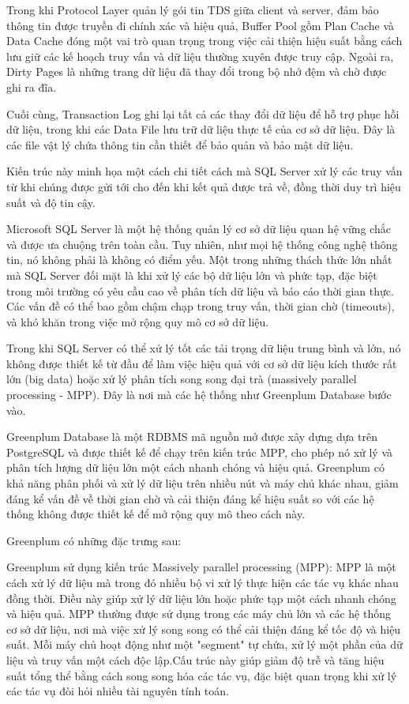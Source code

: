 \documentclass{article}[14pt]
\begin{document}
{{Trong khi Protocol Layer quản lý gói tin TDS giữa client và server, đảm bảo thông tin được truyền đi chính xác và hiệu quả, Buffer Pool gồm Plan Cache và Data Cache đóng một vai trò quan trọng trong việc cải thiện hiệu suất bằng cách lưu giữ các kế hoạch truy vấn và dữ liệu thường xuyên được truy cập. Ngoài ra, Dirty Pages là những trang dữ liệu đã thay đổi trong bộ nhớ đệm và chờ được ghi ra đĩa.

Cuối cùng, Transaction Log ghi lại tất cả các thay đổi dữ liệu để hỗ trợ phục hồi dữ liệu, trong khi các Data File lưu trữ dữ liệu thực tế của cơ sở dữ liệu. Đây là các file vật lý chứa thông tin cần thiết để bảo quản và bảo mật dữ liệu.

Kiến trúc này minh họa một cách chi tiết cách mà SQL Server xử lý các truy vấn từ khi chúng được gửi tới cho đến khi kết quả được trả về, đồng thời duy trì hiệu suất và độ tin cậy.

Microsoft SQL Server là một hệ thống quản lý cơ sở dữ liệu quan hệ vững chắc và được ưa chuộng trên toàn cầu. Tuy nhiên, như mọi hệ thống công nghệ thông tin, nó không phải là không có điểm yếu. Một trong những thách thức lớn nhất mà SQL Server đối mặt là khi xử lý các bộ dữ liệu lớn và phức tạp, đặc biệt trong môi trường có yêu cầu cao về phân tích dữ liệu và báo cáo thời gian thực. Các vấn đề có thể bao gồm chậm chạp trong truy vấn, thời gian chờ (timeouts), và khó khăn trong việc mở rộng quy mô cơ sở dữ liệu.

Trong khi SQL Server có thể xử lý tốt các tải trọng dữ liệu trung bình và lớn, nó không được thiết kế từ đầu để làm việc hiệu quả với cơ sở dữ liệu kích thước rất lớn (big data) hoặc xử lý phân tích song song đại trà (massively parallel processing - MPP). Đây là nơi mà các hệ thống như Greenplum Database bước vào.

Greenplum Database là một RDBMS mã nguồn mở được xây dựng dựa trên PostgreSQL và được thiết kế để chạy trên kiến trúc MPP, cho phép nó xử lý và phân tích lượng dữ liệu lớn một cách nhanh chóng và hiệu quả. Greenplum có khả năng phân phối và xử lý dữ liệu trên nhiều nút và máy chủ khác nhau, giảm đáng kể vấn đề về thời gian chờ và cải thiện đáng kể hiệu suất so với các hệ thống không được thiết kế để mở rộng quy mô theo cách này.

Greenplum có những đặc trưng sau:

Greenplum sử dụng kiến trúc Massively parallel processing (MPP): MPP là một
cách xử lý dữ liệu mà trong đó nhiều bộ vi xử lý thực hiện các tác vụ
khác nhau đồng thời. Điều này giúp xử lý dữ liệu lớn hoặc phức tạp
một cách nhanh chóng và hiệu quả. MPP thường được sử dụng trong
các máy chủ lớn và các hệ thống cơ sở dữ liệu, nơi mà việc xử lý song
song có thể cải thiện đáng kể tốc độ và hiệu suất.
Mỗi máy chủ hoạt động như một "segment" tự chứa, xử lý một phần
của dữ liệu và truy vấn một cách độc lập.Cấu trúc này giúp giảm độ trễ và tăng hiệu suất tổng thể bằng cách
song song hóa các tác vụ, đặc biệt quan trọng khi xử lý các tác vụ đòi
hỏi nhiều tài nguyên tính toán.

}}
\end{document}
